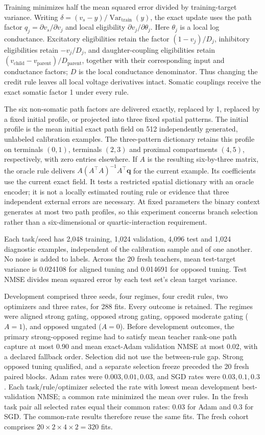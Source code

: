 Training minimizes half the mean squared error divided by training-target variance. Writing $\delta=(v_s-y)/\operatorname{Var}_{\mathrm{train}}(y)$, the exact update uses the path factor $q_j=\partial v_s/\partial v_j$ and local eligibility $\partial v_j/\partial\theta_j$. Here $\theta_j$ is a local log conductance. Excitatory eligibilities retain the factor $(1-v_j)/D_j$, inhibitory eligibilities retain $-v_j/D_j$, and daughter-coupling eligibilities retain $(v_{\mathrm{child}}-v_{\mathrm{parent}})/D_{\mathrm{parent}}$, together with their corresponding input and conductance factors; $D$ is the local conductance denominator. Thus changing the credit rule leaves all local voltage derivatives intact. Somatic couplings receive the exact somatic factor 1 under every rule.

The six non-somatic path factors are delivered exactly, replaced by 1, replaced by a fixed initial profile, or projected into three fixed spatial patterns. The initial profile is the mean initial exact path field on 512 independently generated, unlabeled calibration examples. The three-pattern dictionary retains this profile on terminals $(0,1)$, terminals $(2,3)$ and proximal compartments $(4,5)$, respectively, with zero entries elsewhere. If $A$ is the resulting six-by-three matrix, the oracle rule delivers $A(A^\top A)^{-1}A^\top\boldsymbol q$ for the current example. Its coefficients use the current exact field. It tests a restricted spatial dictionary with an oracle encoder; it is not a locally estimated routing rule or evidence that three independent external errors are necessary. At fixed parameters the binary context generates at most two path profiles, so this experiment concerns branch selection rather than a six-dimensional or quartic-interaction requirement.

Each task/seed has 2,048 training, 1,024 validation, 4,096 test and 1,024 diagnostic examples, independent of the calibration sample and of one another. No noise is added to labels. Across the 20 fresh teachers, mean test-target variance is 0.024108 for aligned tuning and 0.014691 for opposed tuning. Test NMSE divides mean squared error by each test set's clean target variance.

Development comprised three seeds, four regimes, four credit rules, two optimizers and three rates, for 288 fits. Every outcome is retained. The regimes were aligned strong gating, opposed strong gating, opposed moderate gating ($A=1$), and opposed ungated ($A=0$). Before development outcomes, the primary strong-opposed regime had to satisfy mean teacher rank-one path capture at most 0.90 and mean exact-Adam validation NMSE at most 0.02, with a declared fallback order. Selection did not use the between-rule gap. Strong opposed tuning qualified, and a separate selection freeze preceded the 20 fresh paired blocks. Adam rates were $0.003,0.01,0.03$, and SGD rates were $0.03,0.1,0.3$. Each task/rule/optimizer selected the rate with lowest mean development best-validation NMSE; a common rate minimized the mean over rules. In the fresh task pair all selected rates equal their common rates: 0.03 for Adam and 0.3 for SGD. The common-rate results therefore reuse the same fits. The fresh cohort comprises $20\times2\times4\times2=320$ fits.

